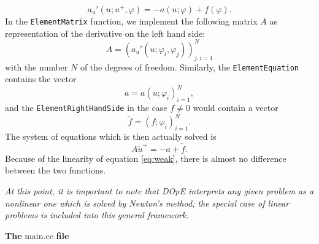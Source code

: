 \begin{equation*}
   a_u'(u;u^+,\varphi) = -a(u;\varphi) + f(\varphi).
\end{equation*}
In the \texttt{ElementMatrix} function, we implement the following matrix $A$ as representation of the derivative on the left hand side:
\begin{equation*}
  A = (a_u'(u;\varphi_i,\varphi_j))_{j,i=1}^N
\end{equation*}
with the number $N$ of the degrees of freedom. Similarly, the \texttt{ElementEquation} contains the vector
\begin{equation*}
  a = a(u;\varphi_i)_{i=1}^{N},
\end{equation*}
and the \texttt{ElementRightHandSide} in the case $f \neq 0$ would contain a vector
\begin{equation*}
  \tilde{f} = (f;\varphi_i)_{i=1}^N.
\end{equation*}
The system of equations which is then actually solved is
\begin{equation*}
  A\tilde{u}^+ = -a + \tilde{f}.
\end{equation*}
Because of the linearity of equation \eqref{eq:weak}, there is almost no difference between the two functions.\\

\vspace{0.1cm}

\textit{At this point, it is important to note that DOpE interprets any given problem as a nonlinear one which is solved by Newton's method; the special case of linear problems is included into this general framework.}\\

\vspace{0.2cm}

\textbf{The} main.cc \textbf{file}\\

\vspace{0.2cm}


